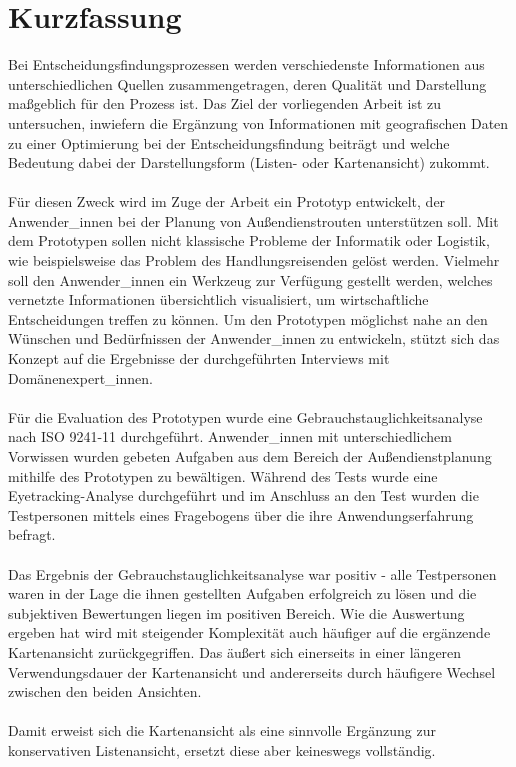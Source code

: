 \documentclass[Bachelorarbeit.tex]{subfiles}
\begin{document}
\chapter*{Kurzfassung}
Bei Entscheidungsfindungsprozessen werden verschiedenste Informationen aus unterschiedlichen Quellen zusammengetragen, deren Qualität und Darstellung maßgeblich für den Prozess ist.
Das Ziel der vorliegenden Arbeit ist zu untersuchen, inwiefern die Ergänzung von Informationen mit 
geografischen Daten zu einer Optimierung bei der Entscheidungsfindung beiträgt und welche Bedeutung 
dabei der Darstellungsform (Listen- oder Kartenansicht) zukommt.
\\
\\
Für diesen Zweck wird im Zuge der Arbeit ein Prototyp entwickelt, der Anwender\_innen bei der Planung von Außendienstrouten unterstützen soll. 
Mit dem Prototypen sollen nicht klassische Probleme der Informatik oder Logistik, wie beispielsweise das Problem des Handlungsreisenden gelöst werden. Vielmehr soll den Anwender\_innen ein Werkzeug zur Verfügung gestellt werden, welches vernetzte Informationen übersichtlich visualisiert, um wirtschaftliche Entscheidungen treffen zu können.
Um den Prototypen möglichst nahe an den Wünschen und Bedürfnissen der Anwender\_innen zu entwickeln, stützt sich das Konzept auf die Ergebnisse der durchgeführten Interviews mit Domänenexpert\_innen.
\\
\\
Für die Evaluation des Prototypen wurde eine Gebrauchstauglichkeitsanalyse nach ISO 9241-11 durchgeführt. Anwender\_innen mit unterschiedlichem Vorwissen wurden gebeten Aufgaben aus dem Bereich der Außendienstplanung mithilfe des Prototypen zu bewältigen. Während des Tests wurde eine Eyetracking-Analyse durchgeführt und im Anschluss an den Test wurden die Testpersonen mittels eines Fragebogens über die ihre Anwendungserfahrung befragt.
\\
\\
Das Ergebnis der Gebrauchstauglichkeitsanalyse war positiv - alle Testpersonen waren in der Lage die ihnen gestellten Aufgaben erfolgreich zu lösen und die subjektiven Bewertungen liegen im positiven Bereich.
Wie die Auswertung ergeben hat wird mit steigender Komplexität auch häufiger auf die ergänzende Kartenansicht zurückgegriffen. 
Das äußert sich einerseits in einer längeren Verwendungsdauer der Kartenansicht und andererseits durch häufigere Wechsel zwischen den beiden Ansichten. 
\\
\\
Damit erweist sich die Kartenansicht als eine sinnvolle Ergänzung zur konservativen Listenansicht, ersetzt diese aber keineswegs vollständig.
\end{document}
